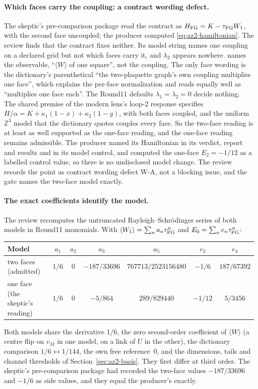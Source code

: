 \paragraph{Which faces carry the coupling: a contract wording defect.}
The skeptic's pre-comparison package read the contract as
$H_{\rm FG}=K-\tau_{\mathrm{FG}} W_1$, with the second face uncoupled; the producer computed
\eqref{eq:az2-hamiltonian}. The review finds that the contract fixes neither.
Its model string names one coupling on a declared grid but not which faces
carry it, and $\lambda_2$ appears nowhere. 
names the observable, ``$\langle W\rangle$ of one square'', not the coupling.
The only face wording is the dictionary's parenthetical ``the two-plaquette
graph's own coupling multiplies one face'', which explains the per-face
normalization and reads equally well as ``multiplies one face each''. The
Round11 defaults $\lambda_1=\lambda_2=0$ decide nothing. The shared premise of
the modern lens's loop-2 response specifies
$H/\alpha=K+\kappa_1(1-x)+\kappa_2(1-y)$, with both faces coupled, and the
uniform $\mathbb Z^3$ model that the dictionary quotes couples every face. So
the two-face reading is at least as well supported as the one-face reading,
and the one-face reading remains admissible. The producer named its
Hamiltonian in its verdict, report and results and in its model control, and
computed the one-face $E_2=-1/12$ as a labelled control value, so there is no
undisclosed model change. The review records the point as contract wording
defect W-A, not a blocking issue, and the gate names the two-face model
exactly.

\paragraph{The exact coefficients identify the model.}
The review recomputes the untruncated Rayleigh--Schr\"odinger series of both
models in Round11 monomials. With
$\langle W_1\rangle=\sum_na_n\tau_{\mathrm{FG}}^n$ and $E_0=\sum_ne_n\tau_{\mathrm{FG}}^n$:
\begin{center}\small
\begin{tabular}{@{}lcccccc@{}}
\toprule
Model & $a_1$ & $a_2$ & $a_3$ & $a_5$ & $e_2$ & $e_4$\\
\midrule
two faces (admitted) & $1/6$ & $0$ & $-187/33696$ & $767713/2523156480$ &
$-1/6$ & $187/67392$\\
one face (the skeptic's reading) & $1/6$ & $0$ & $-5/864$ & $289/829440$ &
$-1/12$ & $5/3456$\\
\bottomrule
\end{tabular}
\end{center}
Both models share the derivative $1/6$, the zero second-order coefficient of
$\langle W\rangle$ (a centre flip on $v_M$ in one model, on a link of $U$ in
the other), the dictionary comparison $1/6\leftrightarrow1/144$, the own free
reference~0, and the dimensions, tails and channel thresholds of
Section~\ref{sec:az2-basis}. They first differ at third order. The skeptic's
pre-comparison package had recorded the two-face values $-187/33696$ and
$-1/6$ as side values, and they equal the producer's exactly.

